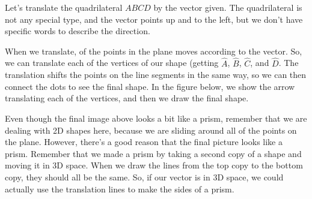 \documentclass{ximera}
\begin{document}
\begin{example}
Let's translate the quadrilateral $ABCD$ by the vector given. The quadrilateral is not any special type, and the vector points up and to the left, but we don't have specific words to describe the direction.
\begin{image}
\end{image}
When we translate,  of the points in the plane moves according to the vector. So, we can translate each of the vertices of our shape (getting $\hat{A}$, $\hat{B}$, $\hat{C}$, and $\hat{D}$. The translation shifts the points on the line segments in the same way, so we can then connect the dots to see the final shape. In the figure below, we show the arrow translating each of the vertices, and then we draw the final shape.
\begin{image}
\end{image}

\end{example}
Even though the final image above looks a bit like a prism, remember that we are dealing with 2D shapes here, because we are sliding around all of the points on the plane. However, there's a good reason that the final picture looks like a prism. Remember that we made a prism by taking a second copy of a shape and moving it in 3D space. When we draw the lines from the top copy to the bottom copy, they should all be the same. So, if our vector is in 3D space, we could actually use the translation lines to make the sides of a prism.
\end{document}
